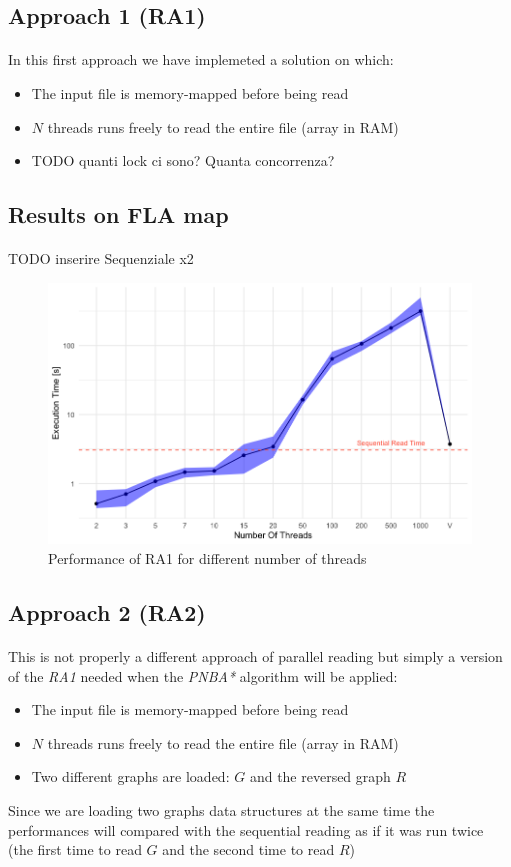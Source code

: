 \documentclass[12pt]{beamer}
\begin{document}
	\subsection{Approach 1 (RA1)}
	\begin{frame}{\secname}
		\framesubtitle{\subsecname}
		In this first approach we have implemeted a solution on which:
		\begin{itemize}
			\item The input file is memory-mapped before being read
			\item $N$ threads runs freely to read the entire file (array in RAM)
			\item TODO quanti lock ci sono? Quanta concorrenza?
		\end{itemize}
	\end{frame}
	\subsection{Results on FLA map}
	\begin{frame}{\secname}
		\framesubtitle{\subsecname}
		TODO inserire Sequenziale x2
		\begin{figure}[ht!]
			\centering
			\includegraphics[width=0.85\linewidth]{read/par_read_1_time.png}
			\caption{Performance of RA1 for different number of threads}
			\label{parread1time}
	 	 \end{figure}	
	\end{frame}
	\subsection{Approach 2 (RA2)}
	\begin{frame}{\secname}
		\framesubtitle{\subsecname}
		This is not properly a different approach of parallel reading but simply a version
		of the \textit{RA1} needed when the \textit{PNBA*} algorithm will be applied:
		\begin{itemize}
			\item The input file is memory-mapped before being read
			\item $N$ threads runs freely to read the entire file (array in RAM)
			\item Two different graphs are loaded: $G$ and the reversed graph $R$
		\end{itemize}
		Since we are loading two graphs data structures at the same time the performances will
		compared with the sequential reading as if it was run twice (the first time to read $G$ and
		the second time to read $R$)
	\end{frame}
\end{document}
